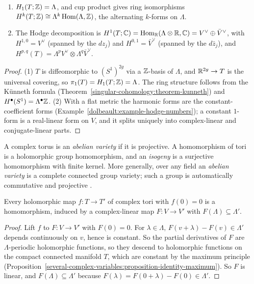 \begin{proposition}\label{abelian-varieties:proposition-torus-cohomology}
\begin{enumerate}
\item $H_1(T; \mathbb{Z}) = \Lambda$, and cup product gives ring isomorphisms $H^k(T; \mathbb{Z}) \cong \Lambda^k\operatorname{Hom}(\Lambda, \mathbb{Z})$, the alternating $k$-forms on $\Lambda$.
\item The Hodge decomposition is $H^1(T; \mathbb{C}) = \operatorname{Hom}_{\mathbb{R}}(\Lambda \otimes \mathbb{R}, \mathbb{C}) = V^\vee \oplus \bar V^\vee$, with $H^{1,0} = V^\vee$ (spanned by the $dz_j$) and
$H^{0,1} = \bar V^\vee$ (spanned by the $d\bar z_j$), and $H^{p,q}(T) = \Lambda^pV^\vee \otimes \Lambda^q\bar V^\vee$.
\end{enumerate}
\end{proposition}

\begin{proof}
(1) $T$ is diffeomorphic to $(S^1)^{2g}$ via a $\mathbb{Z}$-basis of $\Lambda$, and $\mathbb{R}^{2g} \to T$ is the universal covering, so $\pi_1(T) = H_1(T; \mathbb{Z}) = \Lambda$. The ring structure follows from
the K\"unneth formula (Theorem~\ref{singular-cohomology:theorem-kunneth}) and $H^\bullet(S^1) = \Lambda^\bullet\mathbb{Z}$. (2) With a flat metric the harmonic forms are the constant-coefficient
forms (Example~\ref{dolbeault:example-hodge-numbers}); a constant $1$-form is a real-linear form on $V$, and it splits uniquely into complex-linear and conjugate-linear parts.
\end{proof}

\begin{definition}\label{abelian-varieties:definition-abelian-variety}
A complex torus is an \emph{abelian variety} if it is projective. A homomorphism of tori is a holomorphic group homomorphism, and an \emph{isogeny} is a surjective homomorphism
with finite kernel. More generally, over any field an \emph{abelian variety} is a complete connected group variety; such a group is automatically commutative and projective
\cite[Chapter II]{mumford-abelian}.
\end{definition}

\begin{lemma}\label{abelian-varieties:lemma-homomorphisms}
Every holomorphic map $f \colon T \to T'$ of complex tori with $f(0) = 0$ is a homomorphism, induced by a complex-linear map $F \colon V \to V'$ with $F(\Lambda) \subseteq \Lambda'$.
\end{lemma}

\begin{proof}
Lift $f$ to $F \colon V \to V'$ with $F(0) = 0$. For $\lambda \in \Lambda$, $F(v + \lambda) - F(v) \in \Lambda'$ depends continuously on $v$, hence is constant. So the partial derivatives
of $F$ are $\Lambda$-periodic holomorphic functions, so they descend to holomorphic functions on the compact connected manifold $T$, which are constant by the maximum principle
(Proposition~\ref{several-complex-variables:proposition-identity-maximum}). So $F$ is linear, and $F(\Lambda) \subseteq \Lambda'$ because $F(\lambda) = F(0 + \lambda) - F(0) \in \Lambda'$.
\end{proof}

